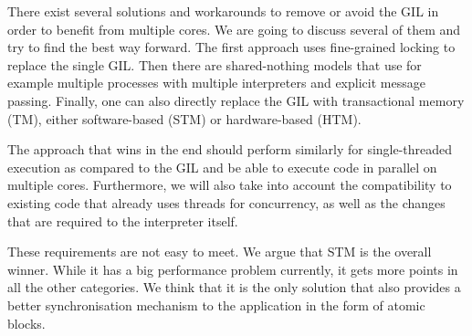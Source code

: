 \documentclass{sigplanconf}
\begin{document}
There exist several solutions and workarounds to remove or avoid the
GIL in order to benefit from multiple cores. We are going to discuss
several of them and try to find the best way forward. The first
approach uses fine-grained locking to replace the single GIL. Then
there are shared-nothing models that use for example multiple
processes with multiple interpreters and explicit message
passing. Finally, one can also directly replace the GIL with
transactional memory (TM), either software-based (STM) or
hardware-based (HTM).

The approach that wins in the end should perform similarly for
single-threaded execution as compared to the GIL and be able to
execute code in parallel on multiple cores. Furthermore, we will also
take into account the compatibility to existing code that already uses
threads for concurrency, as well as the changes that are required to
the interpreter itself.

These requirements are not easy to meet. We argue that STM is the
overall winner. While it has a big performance problem currently, it
gets more points in all the other categories. We think that it is the
only solution that also provides a better synchronisation mechanism to
the application in the form of atomic blocks.





\end{document}
